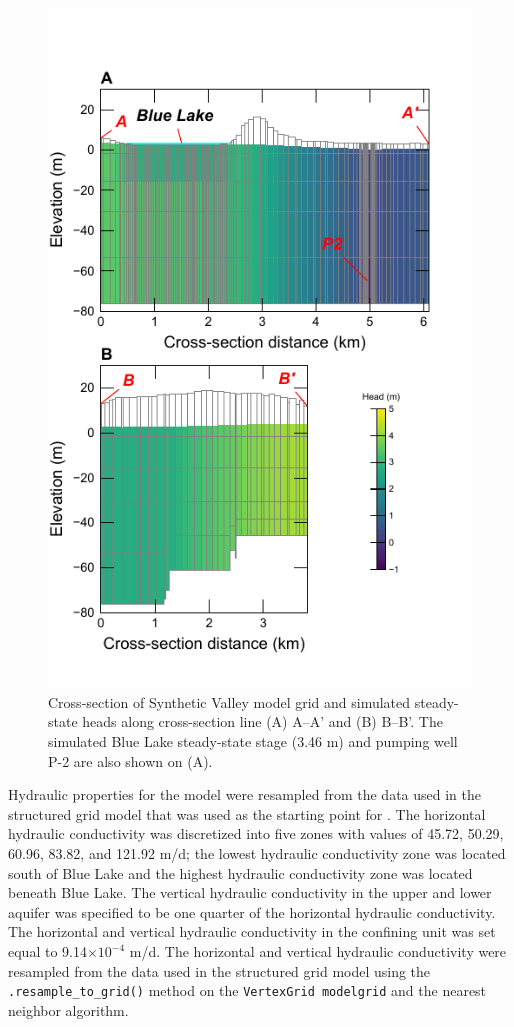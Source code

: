 \documentclass[12pt, oneside]{article}  	%
\begin{document}
\begin{figure}[ht!]
	\begin{center}
		\includegraphics{figure7.pdf}
	\end{center}
	\caption{Cross-section of Synthetic Valley model grid and simulated steady-state heads along cross-section line (A) A--A' and (B) B--B'. The simulated Blue Lake steady-state stage (3.46 m) and pumping well P-2 are also shown on (A).}
	\label{fig:mvxsection}
\end{figure}

Hydraulic properties for the model were resampled from the data used in the structured grid model that was used as the starting point for \cite{hill1998} \citep{pollock2014percomm}. The horizontal hydraulic conductivity was discretized into five zones with values of 45.72, 50.29, 60.96, 83.82, and 121.92 m/d; the lowest hydraulic conductivity zone was located south of Blue Lake and the highest hydraulic conductivity zone was located beneath Blue Lake. The vertical hydraulic conductivity in the upper and lower aquifer was specified to be one quarter of the horizontal hydraulic conductivity. The horizontal and vertical hydraulic conductivity in the confining unit was set equal to 9.14$\times10^{-4}$ m/d. The horizontal and vertical hydraulic conductivity were resampled from the data used in the structured grid model using the \texttt{.resample\_to\_grid()} method on the \texttt{VertexGrid modelgrid} and the nearest neighbor algorithm.
\end{document}
